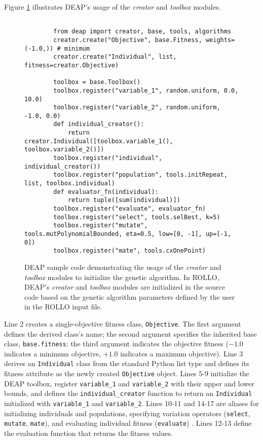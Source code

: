 Figure \ref{fig:deap-code} illustrates \gls{DEAP}'s usage of the \textit{creator} and
\textit{toolbox} modules. 
\begin{figure}[htbp]
    \begin{verbatim}
        
        from deap import creator, base, tools, algorithms
        creator.create("Objective", base.Fitness, weights=(-1.0,)) # minimum
        creator.create("Individual", list, fitness=creator.Objective)

        toolbox = base.Toolbox()
        toolbox.register("variable_1", random.uniform, 0.0, 10.0)
        toolbox.register("variable_2", random.uniform, -1.0, 0.0)
        def individual_creator():
            return creator.Individual([toolbox.variable_1(), toolbox.variable_2()])
        toolbox.register("individual", individual_creator())
        toolbox.register("population", tools.initRepeat, list, toolbox.individual)
        def evaluator_fn(individual):
            return tuple([sum(individual)])
        toolbox.register("evaluate", evaluator_fn)
        toolbox.register("select", tools.selBest, k=5)
        toolbox.register("mutate", tools.mutPolynomialBounded, eta=0.5, low=[0, -1], up=[-1, 0])
        toolbox.register("mate", tools.cxOnePoint)
    \end{verbatim}
    \caption{DEAP sample code demonstrating the usage of the \textit{creator} and
    \textit{toolbox} modules to initialize the genetic algorithm. In \gls{ROLLO}, \gls{DEAP}'s 
    \textit{creator} and \textit{toolbox} modules are initialized in the source 
    code based on the genetic algorithm parameters defined by the user in the 
    \gls{ROLLO} input file. }
    \label{fig:deap-code}
\end{figure}
Line 2 creates a single-objective fitness class, \texttt{Objective}. 
The first argument defines the derived class's name; the second argument 
specifies the inherited base class, \texttt{base.fitness}; the third 
argument indicates the objective fitness ($-1.0$ indicates a minimum objective, 
$+1.0$ indicates a maximum objective). 
Line 3 derives an \texttt{Individual} class from the standard Python list type
and defines its fitness attribute as the newly created \texttt{Objective} object. 
Lines 5-9 initialize the \gls{DEAP} toolbox, register 
\texttt{variable\_1} and \texttt{variable\_2} with their upper and lower bounds, 
and defines the \texttt{individual\_creator} function to return an 
\texttt{Individual} initialized with \texttt{variable\_1} and \texttt{variable\_2}. 
Lines 10-11 and 14-17 are aliases for initializing individuals and populations, 
specifying variation operators (\texttt{select}, \texttt{mutate}, \texttt{mate}), 
and evaluating individual fitness (\texttt{evaluate}) \cite{fortin_deap_2012}. 
Lines 12-13 define the evaluation function that returns the fitness values. 

